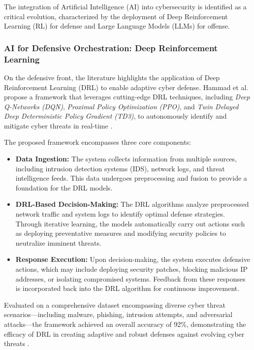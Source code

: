 The integration of Artificial Intelligence (AI) into cybersecurity is identified as a critical evolution,
characterized by the deployment of Deep Reinforcement Learning (RL) for defense and Large Language Models (LLMs) for offense.

\subsubsection{AI for Defensive Orchestration: Deep Reinforcement Learning}

On the defensive front, the literature highlights the application of Deep Reinforcement Learning (DRL) to
enable adaptive cyber defense. Hammad et al. propose a framework that leverages cutting-edge DRL techniques,
including \textit{Deep Q-Networks (DQN)}, \textit{Proximal Policy Optimization (PPO)}, and \textit{Twin Delayed
      Deep Deterministic Policy Gradient (TD3)}, to autonomously identify and mitigate cyber threats in real-time \cite{hammad2024deep}.

The proposed framework encompasses three core components:

\begin{itemize}
      \item \textbf{Data Ingestion:} The system collects information from multiple sources, including intrusion
            detection systems (IDS), network logs, and threat intelligence feeds. This data undergoes preprocessing and
            fusion to provide a foundation for the DRL models.

      \item \textbf{DRL-Based Decision-Making:} The DRL algorithms analyze preprocessed network traffic and
            system logs to identify optimal defense strategies. Through iterative learning, the models automatically
            carry out actions such as deploying preventative measures and modifying security policies to neutralize imminent threats.

      \item \textbf{Response Execution:} Upon decision-making, the system executes defensive actions, which
            may include deploying security patches, blocking malicious IP addresses, or isolating compromised systems.
            Feedback from these responses is incorporated back into the DRL algorithm for continuous improvement.
\end{itemize}

Evaluated on a comprehensive dataset encompassing diverse cyber threat scenarios—including malware, phishing,
intrusion attempts, and adversarial attacks—the framework achieved an overall accuracy of 92\%, demonstrating
the efficacy of DRL in creating adaptive and robust defenses against evolving cyber threats \cite{hammad2024deep}.


